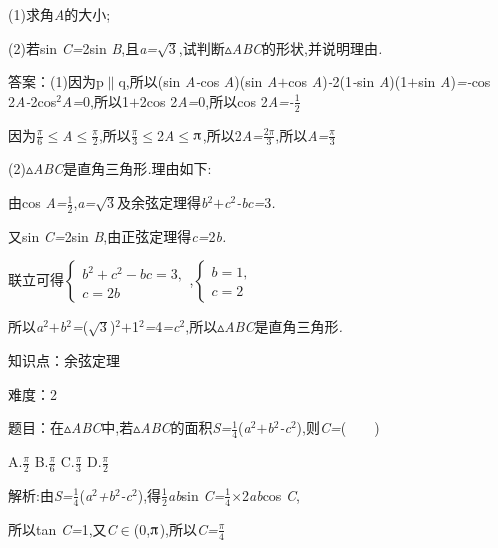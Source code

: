 \documentclass{article} %
\begin{document}
 (1)求角\textit{A}的大小;

 (2)若sin \textit{C=}2sin \textit{B},且\textit{a=}$\sqrt{3}$,试判断$\mathrm{\vartriangle}$\textit{ABC}的形状,并说明理由\textit{.}

 答案：(1)因为p$\mathrm{\parallel}$q,所以(sin \textit{A-}cos \textit{A})(sin \textit{A$+$}cos \textit{A})\textit{-}2(1\textit{-}sin \textit{A})(1\textit{$+$}sin \textit{A})\textit{=-}cos 2\textit{A-}2cos${}^{2}$\textit{A=}0,所以1\textit{$+$}2cos 2\textit{A=}0,所以cos 2\textit{A=-}$\frac{1}{2}$

因为$\frac{\pi}{6}$$\mathrm{\le}$\textit{A}$\mathrm{\le}$$\frac{\pi}{2}$,所以$\frac{\pi}{3}$$\mathrm{\le}$2\textit{A}$\mathrm{\le}$$\piup$,所以2\textit{A=}$\frac{2\pi}{3}$,所以\textit{A=}$\frac{\pi}{3}$

(2)$\mathrm{\vartriangle}$\textit{ABC}是直角三角形\textit{.}理由如下:

由cos \textit{A=}$\frac{1}{2}$,\textit{a=}$\sqrt{3}$及余弦定理得\textit{b}${}^{2}$\textit{$+$c}${}^{2}$\textit{-bc=}3\textit{.}

又sin \textit{C=}2sin \textit{B},由正弦定理得\textit{c=}2\textit{b.}

联立可得$
\begin{cases}
b^2+c^2-bc=3,\\
c=2b
\end{cases}$,$
\begin{cases}
b=1,\\
c=2
\end{cases}$

所以\textit{a}${}^{2}$\textit{$+$b}${}^{2}$\textit{=}($\sqrt{3}$)${}^{2}$\textit{$+$}1${}^{2}$\textit{=}4\textit{=c}${}^{2}$,所以$\mathrm{\vartriangle}$\textit{ABC}是直角三角形\textit{.}



知识点：余弦定理

难度：2

 题目：在$\mathrm{\vartriangle}$\textit{ABC}中,若$\mathrm{\vartriangle}$\textit{ABC}的面积\textit{S=}$\frac{1}{4}$(\textit{a}${}^{2}$\textit{$+$b}${}^{2}$\textit{-c}${}^{2}$),则\textit{C=}(\textit{　　})

 A.$\frac{\pi}{2}$ B.$\frac{\pi}{6}$ C.$\frac{\pi}{3}$ D.$\frac{\pi}{2}$

 解析:由\textit{S=}$\frac{1}{4}$(\textit{a}${}^{2}$\textit{+b}${}^{2}$\textit{-c}${}^{2}$),得$\frac{1}{2}$\textit{ab}sin \textit{C=}$\frac{1}{4}$\textit{$\times$}2\textit{ab}cos \textit{C},

所以tan \textit{C=}1,又\textit{C}$\mathrm{\in}$(0,$\piup$),所以\textit{C=}$\frac{\pi}{4}$
\end{document}
